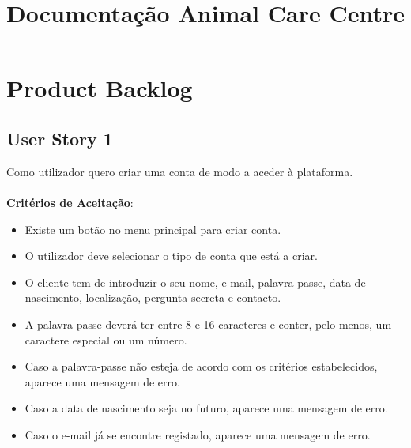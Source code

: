 \documentclass[a4paper,11pt]{article}
\title{Documentação Animal Care Centre}
\author{}
\date{}
\begin{document}
\maketitle
\vspace{-67pt}

\section{Product Backlog}
\subsection*{User Story 1}
Como utilizador quero criar uma conta de modo a aceder à plataforma.\\\\
\textbf{Critérios de Aceitação}:
\begin{itemize}
  \item Existe um botão no menu principal para criar conta.
  \item O utilizador deve selecionar o tipo de conta que está a criar.
  \item O cliente tem de introduzir o seu nome, e-mail, palavra-passe, data de nascimento, localização, pergunta secreta e contacto.
  \item A palavra-passe deverá ter entre 8 e 16 caracteres e conter, pelo menos, um caractere especial ou um número.
  \item Caso a palavra-passe não esteja de acordo com os critérios estabelecidos, aparece uma mensagem de erro.
  \item Caso a data de nascimento seja no futuro, aparece uma mensagem de erro.
  \item Caso o e-mail já se encontre registado, aparece uma mensagem de erro.
\end{itemize}
\end{document}
